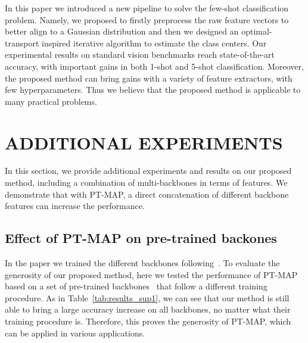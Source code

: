 \documentclass[twoside]{article}
\begin{document}
In this paper we introduced a new pipeline to solve the few-shot classification problem. Namely, we proposed to firstly preprocess the raw feature vectors to better align to a Gaussian distribution and then we designed an optimal-transport inspired iterative algorithm to estimate the class centers. Our experimental results on standard vision benchmarks reach state-of-the-art accuracy, with important gains in both 1-shot and 5-shot classification. Moreover, the proposed method can bring gains with a variety of feature extractors, with few hyperparameters. Thus we believe that the proposed method is applicable to many practical problems.

\newpage
\small




\newpage

\onecolumn
{}
\section{ADDITIONAL EXPERIMENTS}

In this section, we provide additional experiments and results on our proposed method, including a combination of multi-backbones in terms of features. We demonstrate that with PT-MAP, a direct concatenation of different backbone features can increase the performance. 

\subsection{Effect of PT-MAP on pre-trained backones}

In the paper we trained the different backbones following~\cite{mangla2020charting}. To evaluate the generosity of our proposed method, here we tested the performance of PT-MAP based on a set of pre-trained backbones~\cite{wang2019simpleshot} that follow a different training procedure. As in Table~\ref{tab:results_sup1}, we can see that our method is still able to bring a large accuracy increase on all backbones, no matter what their training procedure is. Therefore, this proves the generosity of PT-MAP, which can be applied in various applications.
\end{document}
